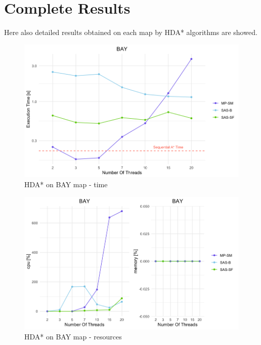 \documentclass[twocolumn, switch]{article} %
\begin{document}
\section{Complete Results}
Here also detailed results obtained on each map by HDA* algorithms are showed.
\begin{figure}[ht!]
  \centering
  \includegraphics[width=1\linewidth]{hda/baytime.png}
  \caption{HDA* on BAY map - time}
  \label{cmpbaytime}
\end{figure}
\begin{figure}[ht!]
  \centering
  \includegraphics[width=1\linewidth]{hda/baycpumem.png}
  \caption{HDA* on BAY map - resources}
  \label{cmpbaycpumem}
\end{figure}
\end{document}
